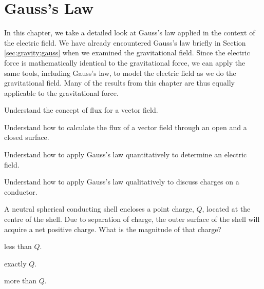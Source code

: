 
\chapter{Gauss's Law}
\label{chapter:gauss}
In this chapter, we take a detailed look at Gauss's law applied in the context of the electric field. We have already encountered Gauss's law briefly in Section \ref{sec:gravity:gauss} when we examined the gravitational field. Since the electric force is mathematically identical to the gravitational force, we can apply the same tools, including Gauss's law, to model the electric field as we do the gravitational field. Many of the results from this chapter are thus equally applicable to the gravitational force. 

\begin{learningObjectives}{
 \item Understand the concept of flux for a vector field.
 \item Understand how to calculate the flux of a vector field through an open and a closed surface.
 \item Understand how to apply Gauss's law quantitatively to determine an electric field.
 \item Understand how to apply Gauss's law qualitatively to discuss charges on a conductor.
 }
\end{learningObjectives}

\begin{opening}
\begin{MCquestion}{A neutral spherical conducting shell encloses a point charge, $Q$, located at the centre of the shell. Due to separation of charge, the outer surface of the shell will acquire a net positive charge. What is the magnitude of that charge? }
\item less than $Q$.
\item exactly $Q$. \correct
\item more than $Q$.
\end{MCquestion}
\end{opening}

